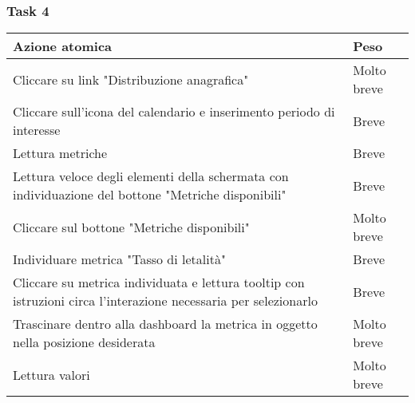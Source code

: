 \subsubsection{Task 4}
\label{sss:iaa-task-4}

{
\renewcommand{\arraystretch}{2}
\begin{longtable}[h]{| p{14cm} | p{2.5cm} |}
    \hline
    \textbf{Azione atomica} & \textbf{Peso} \\
    \hline
    \endhead
    Cliccare su link "Distribuzione anagrafica" & Molto breve \\
    \hline
    Cliccare sull'icona del calendario e inserimento periodo di interesse & Breve  \\
    \hline
    Lettura metriche & Breve \\
    \hline
    Lettura veloce degli elementi della schermata con individuazione del bottone "Metriche disponibili" & Breve \\
    \hline
    Cliccare sul bottone "Metriche disponibili" & Molto breve \\
    \hline
    Individuare metrica "Tasso di letalità"  & Breve \\
    \hline
    Cliccare su metrica individuata e lettura tooltip con istruzioni circa l'interazione necessaria per selezionarlo & Breve \\
    \hline
    Trascinare dentro alla dashboard la metrica in oggetto nella posizione desiderata & Molto breve \\
    \hline
    Lettura valori & Molto breve \\
    \hline
\end{longtable}
}
